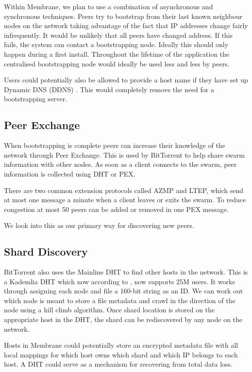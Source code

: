 \documentclass[11pt, a4paper, twoside]{report}
\begin{document}
Within Membrane, we plan to use a combination of asynchronous and synchronous techniques. Peers try to bootstrap from their last known neighbour nodes on the network taking advantage of the fact that IP addresses change fairly infrequently. It would be unlikely that all peers have changed address. If this fails, the system can contact a bootstrapping node. Ideally this should only happen during a first install. Throughout the lifetime of the application the centralised bootstrapping node would ideally be used less and less by peers.

Users could potentially also be allowed to provide a host name if they have set up Dynamic DNS (DDNS) \citep{bound1997dynamic}. This would completely remove the need for a bootstrapping server.

\subsection{Peer Exchange} \label{sec:pex}

When bootstrapping is complete peers can increase their knowledge of the network through Peer Exchange. This is used by BitTorrent to help share swarm information with other nodes. As soon as a client connects to the swarm, peer information is collected using DHT or PEX.

There are two common extension protocols called AZMP and LTEP, which send at most one message a minute when a client leaves or exits the swarm. To reduce congestion at most 50 peers can be added or removed in one PEX message. \citep{vuze2010vuze}

We look into this as our primary way for discovering new peers.

\subsection{Shard Discovery}

BitTorrent also uses the Mainline DHT to find other hosts in the network. This is a Kademlia DHT which now according to \cite{jones2015mainlinedht}, now supports 25M users. It works through assigning each node and file a 160-bit string as an ID. We can work out which node is meant to store a file metadata and crawl in the direction of the node using a hill climb algorithm. Once shard location is stored on the appropriate host in the DHT, the shard can be rediscovered by any node on the network.

Hosts in Membrane could potentially store an encrypted metadata file with all local mappings for which host owns which shard and which IP belongs to each host. A DHT could serve as a mechanism for recovering from total data loss.
\end{document}
